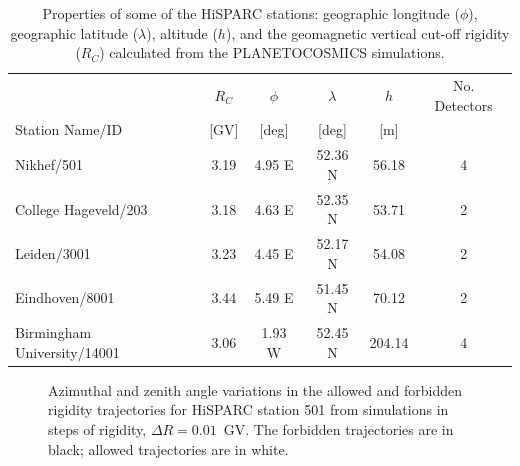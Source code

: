 \begin{table}
	\begin{center}
		\caption{Properties of some of the HiSPARC stations: geographic longitude ($\phi$), geographic latitude ($\lambda$), altitude ($h$), and the geomagnetic vertical cut-off rigidity ($R_C$) calculated from the PLANETOCOSMICS simulations.}
		\label{tab:HS_stns}
		\begin{tabular}{l c c c c c}
			\hline
			& $R_C$  & $\phi$ & $\lambda$  & $h$  & No. Detectors\\
			Station Name/ID & [GV] & [deg] & [deg] & [m]  & \\
			\hline
			Nikhef/501 & 3.19 & 4.95 E & 52.36 N & 56.18 & 4 \\
			College Hageveld/203 & 3.18 & 4.63 E  & 52.35 N & 53.71  & 2 \\
			Leiden/3001 & 3.23 & 4.45 E & 52.17 N & 54.08 & 2 \\
			Eindhoven/8001  & 3.44 & 5.49 E & 51.45 N & 70.12 & 2 \\
			Birmingham University/14001  & 3.06 & 1.93 W & 52.45 N & 204.14 & 4  \\
			\hline
		\end{tabular}
	\end{center}
\end{table}

\begin{figure}[h]
	\centering
	
	\caption{Azimuthal and zenith angle variations in the allowed and forbidden rigidity trajectories for HiSPARC station 501 from simulations in steps of rigidity, $\Delta R = 0.01$~GV. The forbidden trajectories are in black; allowed trajectories are in white.}
	\label{fig:R_C2}
\end{figure}

